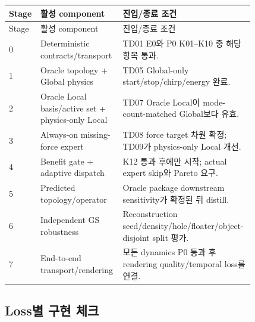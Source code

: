 \documentclass[10pt,a4paper]{article}
\begin{document}
\begin{longtable}{L{0.06\linewidth}L{0.27\linewidth}L{0.49\linewidth}}
\toprule
Stage & 활성 component & 진입/종료 조건 \\
\midrule
\endfirsthead
\toprule
Stage & 활성 component & 진입/종료 조건 \\
\midrule
{} & Deterministic contracts/transport & TD01 E0와 P0 K01--K10 중 해당 항목 통과. \\
1 & Oracle topology + Global physics & TD05 Global-only start/stop/chirp/energy 완료. \\
2 & Oracle Local basis/active set + physics-only Local & TD07 Oracle Local이 mode-count-matched Global보다 유효. \\
3 & Always-on missing-force expert & TD08 force target 차원 확정; TD09가 physics-only Local 개선. \\
4 & Benefit gate + adaptive dispatch & K12 통과 후에만 시작; actual expert skip와 Pareto 요구. \\
5 & Predicted topology/operator & Oracle package downstream sensitivity가 확정된 뒤 distill. \\
6 & Independent GS robustness & Reconstruction seed/density/hole/floater/object-disjoint split 평가. \\
7 & End-to-end transport/rendering & 모든 dynamics P0 통과 후 rendering quality/temporal loss를 연결. \\
\bottomrule
\end{longtable}

\subsection{Loss별 구현 체크}
\end{document}
